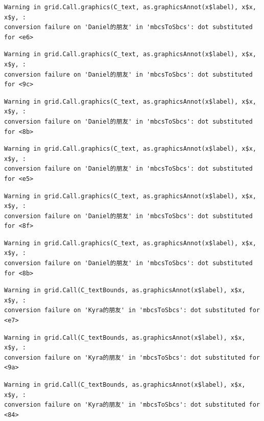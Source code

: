 \documentclass[
  letterpaper,
  DIV=11,
  numbers=noendperiod]{scrreprt}
\begin{document}
\begin{verbatim}
Warning in grid.Call.graphics(C_text, as.graphicsAnnot(x$label), x$x, x$y, :
conversion failure on 'Daniel的朋友' in 'mbcsToSbcs': dot substituted for <e6>
\end{verbatim}

\begin{verbatim}
Warning in grid.Call.graphics(C_text, as.graphicsAnnot(x$label), x$x, x$y, :
conversion failure on 'Daniel的朋友' in 'mbcsToSbcs': dot substituted for <9c>
\end{verbatim}

\begin{verbatim}
Warning in grid.Call.graphics(C_text, as.graphicsAnnot(x$label), x$x, x$y, :
conversion failure on 'Daniel的朋友' in 'mbcsToSbcs': dot substituted for <8b>
\end{verbatim}

\begin{verbatim}
Warning in grid.Call.graphics(C_text, as.graphicsAnnot(x$label), x$x, x$y, :
conversion failure on 'Daniel的朋友' in 'mbcsToSbcs': dot substituted for <e5>
\end{verbatim}

\begin{verbatim}
Warning in grid.Call.graphics(C_text, as.graphicsAnnot(x$label), x$x, x$y, :
conversion failure on 'Daniel的朋友' in 'mbcsToSbcs': dot substituted for <8f>
\end{verbatim}

\begin{verbatim}
Warning in grid.Call.graphics(C_text, as.graphicsAnnot(x$label), x$x, x$y, :
conversion failure on 'Daniel的朋友' in 'mbcsToSbcs': dot substituted for <8b>
\end{verbatim}

\begin{verbatim}
Warning in grid.Call(C_textBounds, as.graphicsAnnot(x$label), x$x, x$y, :
conversion failure on 'Kyra的朋友' in 'mbcsToSbcs': dot substituted for <e7>
\end{verbatim}

\begin{verbatim}
Warning in grid.Call(C_textBounds, as.graphicsAnnot(x$label), x$x, x$y, :
conversion failure on 'Kyra的朋友' in 'mbcsToSbcs': dot substituted for <9a>
\end{verbatim}

\begin{verbatim}
Warning in grid.Call(C_textBounds, as.graphicsAnnot(x$label), x$x, x$y, :
conversion failure on 'Kyra的朋友' in 'mbcsToSbcs': dot substituted for <84>
\end{verbatim}
\end{document}
